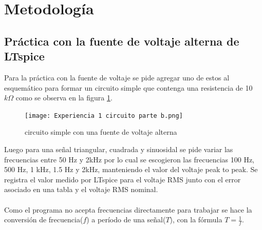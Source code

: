 \documentclass[letterpaper,11pt]{article} %
\begin{document}





\section{Metodología}
\subsection{Práctica con la fuente de voltaje alterna de LTspice}
Para la práctica con la fuente de voltaje se pide agregar uno de estos al esquemático para formar un circuito simple que contenga una resistencia de 10 $k\Omega$ como se observa en la figura \ref{circuito para la corriente alterna}.
\begin{figure}
    \centering    \texttt{[image: Experiencia 1 circuito parte b.png]}
    \caption{circuito simple con una fuente de voltaje alterna}
    \label{circuito para la corriente alterna}
\end{figure}
Luego para una señal triangular, cuadrada y sinuosidal se pide variar las frecuencias entre 50 Hz y 2kHz por lo cual se escogieron las frecuencias 100 Hz, 500 Hz, 1 kHz, 1.5 Hz y 2kHz, manteniendo el valor del voltaje peak to peak. Se registra el valor medido por LTspice para el voltaje RMS junto con el error asociado en una tabla y el voltaje RMS nominal. \\ \\
Como el programa no acepta frecuencias directamente para trabajar se hace la conversión de frecuencia($f$) a período de una señal($T$), con la fórmula $T=\frac{1}{f}$.
\end{document}
